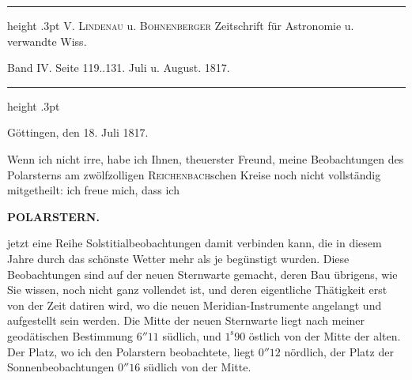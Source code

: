 \par\bigskip{}
\hypertarget{native-398-part-lower}{}\label{native-398-part-lower}
\begin{center}\parbox{.98\linewidth}{\centering\small\frenchspacing
\hrule height .3pt\relax\vspace{2.5pt}
V. \textsc{Lindenau} u. \textsc{Bohnenberger} Zeitschrift für Astronomie u. verwandte Wiss.\par
Band IV. Seite 119..131. Juli u. August. 1817.\par
\vspace{2.5pt}\hrule height .3pt\relax
}\end{center}
\begin{flushright}Göttingen, den 18. Juli 1817.\end{flushright}
\par\indent Wenn ich nicht irre, habe ich Ihnen, theuerster Freund, meine Beobachtungen des Polarsterns am zwölfzolligen \textsc{Reichenbach}schen Kreise noch nicht vollständig mitgetheilt: ich freue mich, dass ich
\par
{}
\thispagestyle{gaussVIGathering74}
\clearpage
\thispagestyle{empty}
\noindent{}%
%
\parbox[t]{\dimexpr\linewidth-24mm\relax}{\centering\footnotesize\bfseries POLARSTERN.\par}%
\makebox[12mm][r]{}\par\nobreak\medskip
\noindent jetzt eine Reihe Solstitialbeobachtungen damit verbinden kann, die in diesem Jahre durch das schönste Wetter mehr als je begünstigt wurden. Diese Beobachtungen sind auf der neuen Sternwarte gemacht, deren Bau übrigens, wie Sie wissen, noch nicht ganz vollendet ist, und deren eigentliche Thätigkeit erst von der Zeit datiren wird, wo die neuen Meridian-Instrumente angelangt und aufgestellt sein werden. Die Mitte der neuen Sternwarte liegt nach meiner geodätischen Bestimmung $6''11$ südlich, und $1^{\mathrm s}90$ östlich von der Mitte der alten. Der Platz, wo ich den Polarstern beobachtete, liegt $0''12$ nördlich, der Platz der Sonnenbeobachtungen $0''16$ südlich von der Mitte.

